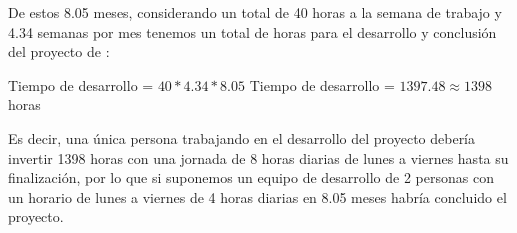 De estos 8.05 meses, considerando un total de 40 horas a la semana de trabajo y  4.34 semanas por mes tenemos un total de horas para el desarrollo y conclusión del proyecto de :

\begin{center}
	Tiempo de desarrollo = $ 40 * 4.34 * 8.05 $
	Tiempo de desarrollo = $ 1397.48 \approx 1398 $ horas
\end{center}


Es  decir,  una  única  persona  trabajando  en  el  desarrollo  del  proyecto  debería invertir 1398 horas con una jornada de 8 horas diarias de lunes a viernes hasta su finalización, por lo que si suponemos un equipo de desarrollo de 2 personas con un horario de lunes a viernes de 4 horas diarias en 8.05 meses habría concluido el proyecto.

